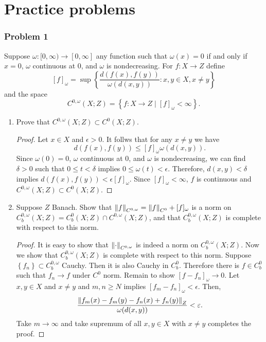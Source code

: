 \documentclass[a4paper]{article}
\begin{document}
\section{Practice problems}
\subsubsection*{Problem 1}
Suppose $\omega: [0, \infty) \to [0, \infty]$ any function 
such that $\omega(x) = 0$ if and only if $x = 0$, 
$\omega$ continuous at 
$0$, and $\omega$ is nondecreasing. For $f: X \to Z$ define
\[
[f]_\omega = \sup\left\{ \frac{d(f(x),f(y))}{\omega(d(x,y))} :
x, y \in X, x \neq y \right\}
\]
and the space 
\[
C^{0, \omega} (X; Z) = \left\{ f: X \to Z \mid [f]_\omega < \infty \right\}.
\]
{
\newcommand{\cw}{{C^{0, \omega}}}
\newcommand{\cwb}{{C^{0, \omega}_b}}
\begin{enumerate}
  \item Prove that $\cw(X; Z) \subset C^0(X; Z)$.
  \begin{proof}
    Let $x \in X$ and $\epsilon > 0$. It follws that for 
    any $x \neq y$ we have 
    \[
    d(f(x), f(y)) \leq [f]_\omega \omega(d(x, y)).
    \]
    Since $\omega(0) = 0$, $\omega$ continuous
    at $0$, and $\omega$ is nondecreasing, we can find 
    $\delta > 0$ such that $0 \leq t < \delta$ implies 
    $0 \leq \omega(t) < \epsilon$. 
    Therefore,
    $d(x, y) < \delta$ implies $d(f(x), f(y)) < \epsilon [f]_{\omega}$.
    Since $[f]_{\omega} < \infty$, $f$ is continuous and 
    $\cw (X; Z) \subset C^0(X; Z)$.
  \end{proof}

  \item Suppose $Z$ Banach. Show that $\norm{f}_{\cw} = \norm{f}_{C^0} + [f]_\omega$
  is a norm on $\cwb(X; Z) = C^0_b(X; Z) \cap \cw(X; Z)$, and 
  that $\cwb(X;Z)$ is complete with respect to this norm.

  \begin{proof}
    It is easy to show that $\norm{\cdot}_{\cw}$ is indeed a
    norm on $\cwb(X; Z)$. Now we show that $\cwb(X; Z)$
    is complete with respect to this norm.
    Suppose $\left\{ f_n \right\} \subset \cwb$ Cauchy. Then 
    it is also Cauchy in $C^0_b$. Therefore there is $f \in C^0_b$
    such that $f_n \to f$ under $C^0$ norm. Remain to show 
    $[f - f_n]_\omega \to 0$. Let $x, y \in X$ and $x \neq y$
    and $m, n \geq N$ implies $[f_m - f_n]_\omega < \epsilon$.
    Then, 
    \[
    \begin{aligned}
      \frac{\left\lVert f_m(x) - f_m(y) - f_n(x) + f_n(y)\right\rVert_Z}{\omega(d(x, y))}
      < \varepsilon.
    \end{aligned}
    \]
    Take $m \to \infty$ and take supremum of all 
    $x, y \in X$ with $x \neq y$
    completes the proof.
  \end{proof}


\end{enumerate}}
\end{document}

